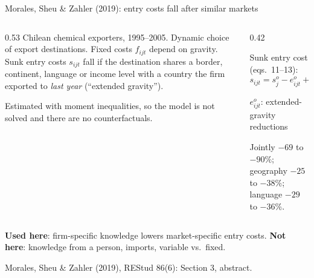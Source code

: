 \documentclass[11pt,aspectratio=169,notes]{beamer}
\newcommand{\src}[1]{\par\vfill{\color{mute}\scriptsize #1\par}}
\begin{document}
\begin{frame}{Morales, Sheu \& Zahler (2019): entry costs fall after similar markets}
\vspace{0.15cm}
\begin{columns}[T]
\begin{column}{0.53\textwidth}
{\footnotesize Chilean chemical exporters, 1995--2005. Dynamic choice of export destinations. Fixed costs $f_{ijt}$ depend on gravity. Sunk entry costs $s_{ijt}$ fall if the destination shares a border, continent, language or income level with a country the firm exported to \emph{last year} (``extended gravity'').}
\vspace{0.2cm}

{\footnotesize Estimated with moment inequalities, so the model is not solved and there are no counterfactuals.}
\end{column}
\begin{column}{0.42\textwidth}
\begin{mathbox}
\small Sunk entry cost (eqs.~11--13):
\[
s_{ijt}=s_j^o-e^o_{ijt}+\varepsilon^S_{ijt}
\]
\vspace{-0.4cm}

{\footnotesize $e^o_{ijt}$: extended-gravity reductions}
\end{mathbox}
\vspace{0.1cm}
{\footnotesize Jointly $-69$ to $-90\%$; geography $-25$ to $-38\%$; language $-29$ to $-36\%$.}
\end{column}
\end{columns}
\vspace{0.15cm}
{\small\textbf{Used here}: firm-specific knowledge lowers market-specific entry costs. \textbf{Not here}: knowledge from a person, imports, variable vs.\ fixed.}
\src{Morales, Sheu \& Zahler (2019), REStud 86(6): Section 3, abstract.}
\end{frame}
\end{document}
